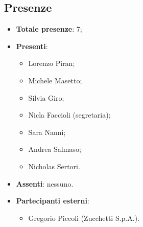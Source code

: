 \documentclass[11pt]{article}
\begin{document}
	\subsection{Presenze}
	\begin{itemize}
		\item \textbf{Totale presenze}: 7;
		\item \textbf{Presenti}:
		\begin{itemize}
			\item Lorenzo Piran;
			\item Michele Masetto;
			\item Silvia Giro;
			\item Nicla Faccioli (segretaria);
			\item Sara Nanni;
			\item Andrea Salmaso;
			\item Nicholas Sertori.
		\end{itemize}
		\item \textbf{Assenti}: nessuno.
		\item \textbf{Partecipanti esterni}:
		\begin{itemize}
			\item Gregorio Piccoli (Zucchetti S.p.A.).
		\end{itemize}
	\end{itemize}

	\newpage
\end{document}
